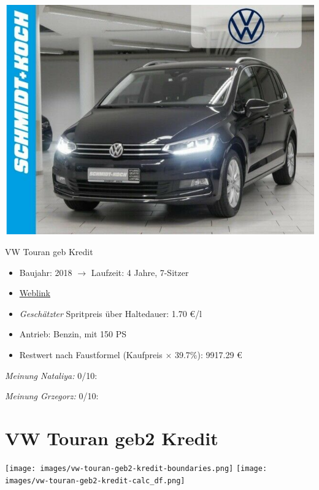 \documentclass[landscape, DIV=99, 14pt]{scrartcl}
\begin{document}
\pagebreak
\begin{center}
\includegraphics[width=0.9\columnwidth]{cars/vw-touran-geb.png}

VW Touran geb Kredit
\end{center}

\begin{itemize}
    \item Baujahr: 2018 $\rightarrow$ Laufzeit: 4 Jahre, 7-Sitzer
    \item \href{https://suchen.mobile.de/fahrzeuge/details.html?id=338082714}{Weblink}
    \item \emph{Gesch\"atzter} Spritpreis \"uber Haltedauer: 1.70 \euro{}/l
    \item Antrieb: Benzin, mit 150 PS
    \item Restwert nach Faustformel (Kaufpreis $\times$ 39.7\%): 9917.29 \euro{}
\end{itemize}

\begin{small}
\emph{Meinung Nataliya:} 0/10: 
        
\emph{Meinung Grzegorz:} 0/10: 
\end{small}

\pagebreak


\twocolumn

\section*{VW Touran geb2 Kredit}
\begin{center}
\texttt{[image: images/vw-touran-geb2-kredit-boundaries.png]}
\null
\vspace{0.5cm}
\texttt{[image: images/vw-touran-geb2-kredit-calc\_df.png]}
\end{center}
\end{document}

